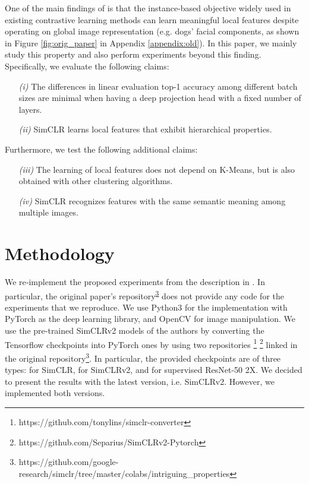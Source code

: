     One of the main findings of \cite{chen2021intriguing} is that the instance-based objective widely used in existing contrastive learning methods can learn meaningful local features despite operating on global image representation (e.g. dogs' facial components, as shown in Figure \ref{fig:orig_paper} in Appendix \ref{appendix:old}). In this paper, we mainly study this property and also perform experiments beyond this finding. Specifically, we evaluate the following claims:
    \begin{itemize}
    \item[\textit{(i)}]
    The differences in linear evaluation top-1 accuracy among different batch sizes are minimal when having a deep projection head with a fixed number of layers. 
    
    
    \item[\textit{(ii)}] SimCLR learns local features that exhibit hierarchical properties. 
    \end{itemize}
    Furthermore, we test the following additional claims:
    \begin{itemize}
    \item[\textit{(iii)}] 
    The learning of local features does not depend on K-Means, but is also obtained with other clustering algorithms.
    \item[\textit{(iv)}]
    SimCLR recognizes features with the same semantic meaning among multiple images.
    \end{itemize}





\section{Methodology}
We re‐implement the proposed experiments from the description in \cite{chen2021intriguing}. In particular, the original paper's repository\textsuperscript{\ref{original_repo}} does not provide any code for the experiments that we reproduce.  We use Python3 for the implementation with PyTorch \cite{NEURIPS2019_9015} as the deep learning library, and OpenCV \cite{opencv_library} for image manipulation. We use the pre-trained SimCLRv2 models of the authors by converting the Tensorflow checkpoints into PyTorch ones by using two repositories \footnote{https://github.com/tonylins/simclr-converter\label{checkpoints:1}} \footnote{https://github.com/Separius/SimCLRv2-Pytorch\label{checkpoints:2}} linked in the original repository\footnote{https://github.com/google-research/simclr/tree/master/colabs/intriguing\_properties\label{original_repo}}. In particular, the provided checkpoints are of three types: for SimCLR, for SimCLRv2, and for supervised ResNet-50 2X. We decided to present the results with the latest version, i.e. SimCLRv2. However, we implemented both versions.

